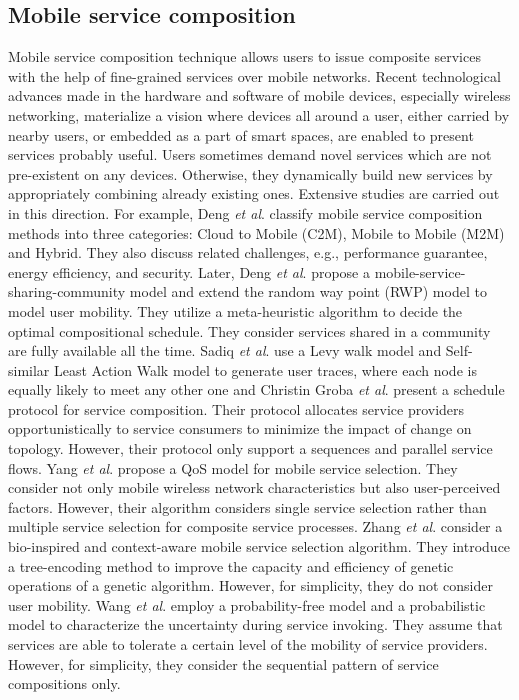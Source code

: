 \documentclass[journal]{IEEEtran}
\begin{document}
\subsection{Mobile service composition}
Mobile service composition technique allows users to issue composite services with the help of fine-grained services over mobile networks. Recent technological advances made in the hardware and software of mobile devices, especially wireless networking, materialize a vision where devices all around a user, either carried by nearby users, or embedded as a part of smart spaces, are enabled to present services probably useful. Users sometimes demand novel services which are not pre-existent on any devices. Otherwise, they dynamically build new services by appropriately combining already existing ones. Extensive studies are carried out in this direction. 
For example, Deng \emph{et al}. \cite{Deng2016} classify mobile service composition methods into three categories: Cloud to Mobile (C2M), Mobile to Mobile (M2M) and Hybrid. They also discuss related challenges, e.g., performance guarantee, energy efficiency, and security.
Later, Deng \emph{et al}. \cite{Deng2017} propose a mobile-service-sharing-community model and extend the random way point (RWP) model to model user mobility. They utilize a meta-heuristic algorithm to decide the optimal compositional schedule. They consider services shared in a community are fully available all the time.
Sadiq \emph{et al}. \cite{sadiq2015service} use a Levy walk model and Self-similar Least Action Walk {\color{red}{(SLAW)}} model to generate user traces, where each node is equally likely to meet any other one and 
{\color{blue}{the connectivity between devices is implemented using multi-hop paths.}}
Christin Groba \emph{et al}. \cite{groba2014opportunistic} present a schedule protocol for service composition. Their protocol allocates service providers opportunistically to service consumers to minimize the impact of change on topology. However, their protocol only support a sequences and parallel service flows.
Yang \emph{et al}. \cite{Yang2010} propose a QoS model for mobile service selection. They consider not only mobile wireless network characteristics but also user-perceived factors. However, their algorithm considers single service selection rather than multiple service selection for composite service processes.
Zhang \emph{et al}. \cite{Zhang2016qos} consider a bio-inspired and context-aware mobile service selection algorithm. They introduce a tree-encoding method to improve the capacity and efficiency of genetic operations of a genetic algorithm. However, for simplicity, they do not consider user mobility.
Wang \emph{et al}. \cite{wang2011exploiting} employ a probability-free model and a probabilistic model to characterize the uncertainty during service invoking. They assume that services are able to tolerate a certain level of the mobility of service providers. However, for simplicity, they consider the sequential pattern of service compositions only.
\end{document}
